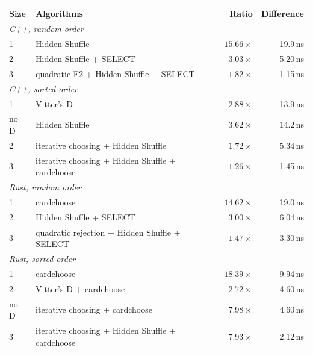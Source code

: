 \begin{tabular}{ llrr }
Size & Algorithms & Ratio & Difference \\
\hline
\multicolumn{4}{l}{\emph{C++, random order}} \\
1 & Hidden Shuffle & \(15.66\times\) & 19.9\,ns \\
2 & Hidden Shuffle + SELECT & \(3.03\times\) & 5.20\,ns \\
3 & quadratic F2 + Hidden Shuffle + SELECT & \(1.82\times\) & 1.15\,ns \\
\multicolumn{4}{l}{\emph{C++, sorted order}} \\
1 & Vitter's D & \(2.88\times\) & 13.9\,ns \\
no D & Hidden Shuffle & \(3.62\times\) & 14.2\,ns \\
2 & iterative choosing + Hidden Shuffle & \(1.72\times\) & 5.34\,ns \\
3 & iterative choosing + Hidden Shuffle + cardchoose & \(1.26\times\) & 1.45\,ns \\
\multicolumn{4}{l}{\emph{Rust, random order}} \\
1 & cardchoose & \(14.62\times\) & 19.0\,ns \\
2 & Hidden Shuffle + SELECT & \(3.00\times\) & 6.04\,ns \\
3 & quadratic rejection + Hidden Shuffle + SELECT & \(1.47\times\) & 3.30\,ns \\
\multicolumn{4}{l}{\emph{Rust, sorted order}} \\
1 & cardchoose & \(18.39\times\) & 9.94\,ns \\
2 & Vitter's D + cardchoose & \(2.72\times\) & 4.60\,ns \\
no D & iterative choosing + cardchoose & \(7.98\times\) & 4.60\,ns \\
3 & iterative choosing + Hidden Shuffle + cardchoose & \(7.93\times\) & 2.12\,ns \\
\end{tabular}
